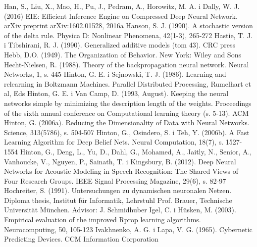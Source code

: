 \documentclass[12pt,a4paper,twoside]{article}
\begin{document}
\begin{thebibliography}{99}
 Han, S., Liu, X., Mao, H., Pu, J., Pedram, A., Horowitz, M. A. i Dally, W. J. (2016) EIE: Efficient Inference Engine on Compressed Deep Neural Network. arXiv preprint arXiv:1602.01528, 2016a
 Hanson, S. J. (1990). A stochastic version of the delta rule. Physica D: Nonlinear Phenomena, 42(1-3), 265-272
 Hastie, T. J. i Tibshirani, R. J. (1990). Generalized additive models (tom 43). CRC press
 Hebb, D.O. (1949). The Organization of Behavior. New York: Wiley and Sons
 Hecht-Nielsen, R. (1988). Theory of the backpropagation neural network. Neural Networks, 1, s. 445
 Hinton, G. E. i Sejnowski, T. J. (1986). Learning and relearning in Boltzmann Machines. Parallel Distributed Processing, Rumelhart et al, Eds
 Hinton, G. E. i Van Camp, D. (1993, August). Keeping the neural networks simple by minimizing the description length of the weights. Proceedings of the sixth annual conference on Computational learning theory (s. 5-13). ACM
 Hinton, G. (2006a). Reducing the Dimensionality of Data with Neural Networks. Science, 313(5786), s. 504-507
 Hinton, G., Osindero, S. i Teh, Y. (2006b). A Fast Learning Algorithm for Deep Belief Nets. Neural Computation, 18(7), s. 1527-1554
 Hinton, G., Deng, L., Yu, D., Dahl, G., Mohamed, A., Jaitly, N., Senior, A., Vanhoucke, V., Nguyen, P., Sainath, T. i Kingsbury, B. (2012). Deep Neural Networks for Acoustic Modeling in Speech Recognition: The Shared Views of Four Research Groups. IEEE Signal Processing Magazine, 29(6), s. 82-97
 Hochreiter, S. (1991). Untersuchungen zu dynamischen neuronalen Netzen. Diploma thesis, Institut für Informatik, Lehrstuhl Prof. Brauer, Technische Universität München. Advisor: J. Schmidhuber
 Igel, C. i Hüsken, M. (2003). Empirical evaluation of the improved Rprop learning algorithms. Neurocomputing, 50, 105-123
 Ivakhnenko, A. G. i Lapa, V. G. (1965). Cybernetic Predicting Devices. CCM Information Corporation

\end{thebibliography}
\end{document}
